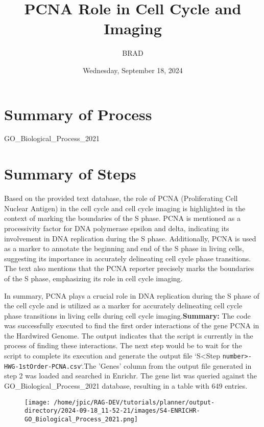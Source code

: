 \documentclass{article}
\begin{document}
\title{PCNA Role in Cell Cycle and Imaging}
\date{Wednesday, September 18, 2024}
\author{BRAD}

\maketitle

\section*{Summary of Process}
GO\_Biological\_Process\_2021

\section*{Summary of Steps}
Based on the provided text database, the role of PCNA (Proliferating Cell Nuclear Antigen) in the cell cycle and cell cycle imaging is highlighted in the context of marking the boundaries of the S phase. PCNA is mentioned as a processivity factor for DNA polymerase epsilon and delta, indicating its involvement in DNA replication during the S phase. Additionally, PCNA is used as a marker to annotate the beginning and end of the S phase in living cells, suggesting its importance in accurately delineating cell cycle phase transitions. The text also mentions that the PCNA reporter precisely marks the boundaries of the S phase, emphasizing its role in cell cycle imaging.

In summary, PCNA plays a crucial role in DNA replication during the S phase of the cell cycle and is utilized as a marker for accurately delineating cell cycle phase transitions in living cells during cell cycle imaging.\textbf{Summary:} The code was successfully executed to find the first order interactions of the gene PCNA in the Hardwired Genome. The output indicates that the script is currently in the process of finding these interactions. The next step would be to wait for the script to complete its execution and generate the output file `S<Step \texttt{number>-HWG-1stOrder-PCNA.csv}`.The 'Genes' column from the output file generated in step 2 was loaded and searched in Enrichr. The gene list was queried against the GO\_Biological\_Process\_2021 database, resulting in a table with 649 entries.

\begin{figure}
    \centering
    \texttt{[image: /home/jpic/RAG-DEV/tutorials/planner/output-directory/2024-09-18\_11-52-21/images/S4-ENRICHR-GO\_Biological\_Process\_2021.png]}
\end{figure}
\end{document}
